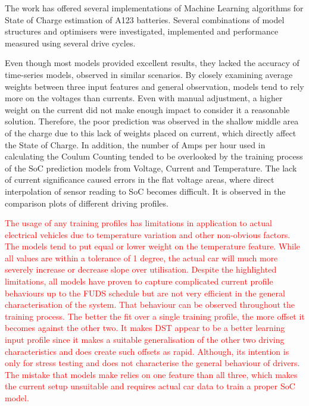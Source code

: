 The work has offered several implementations of Machine Learning algorithms for State of Charge estimation of A123 batteries.
Several combinations of model structures and optimisers were investigated, implemented and performance measured using several drive cycles.

%
%
Even though most models provided excellent results, they lacked the accuracy of time-series models, observed in similar scenarios.
By closely examining average weights between three input features and general observation, models tend to rely more on the voltages than currents.
Even with manual adjustment, a higher weight on the current did not make enough impact to consider it a reasonable solution. 
Therefore, the poor prediction was observed in the shallow middle area of the charge due to this lack of weights placed on current, which directly affect the State of Charge.
In addition, the number of Amps per hour used in calculating the Coulum Counting tended to be overlooked by the training process of the SoC prediction models from Voltage, Current and Temperature.
The lack of current significance caused errors in the flat voltage areas, where direct interpolation of sensor reading to SoC becomes difficult.
It is observed in the comparison plots of different driving profiles. 

%
%
\textcolor{red}{The usage of any training profiles has limitations in application to actual electrical vehicles due to temperature variation and other non-obvious factors.
The models tend to put equal or lower weight on the temperature feature.
While all values are within a tolerance of 1 degree, the actual car will much more severely increase or decrease slope over utilisation.
Despite the highlighted limitations, all models have proven to capture complicated current profile behaviours up to the FUDS schedule but are not very efficient in the general characterisation of the system.
That behaviour can be observed throughout the training process.
The better the fit over a single training profile, the more offset it becomes against the other two.
It makes DST appear to be a better learning input profile since it makes a suitable generalisation of the other two driving characteristics and does create such offsets as rapid.
Although, its intention is only for stress testing and does not characterise the general behaviour of drivers.
The mistake that models make relies on one feature than all three, which makes the current setup unsuitable and requires actual car data to train a proper SoC model.}

